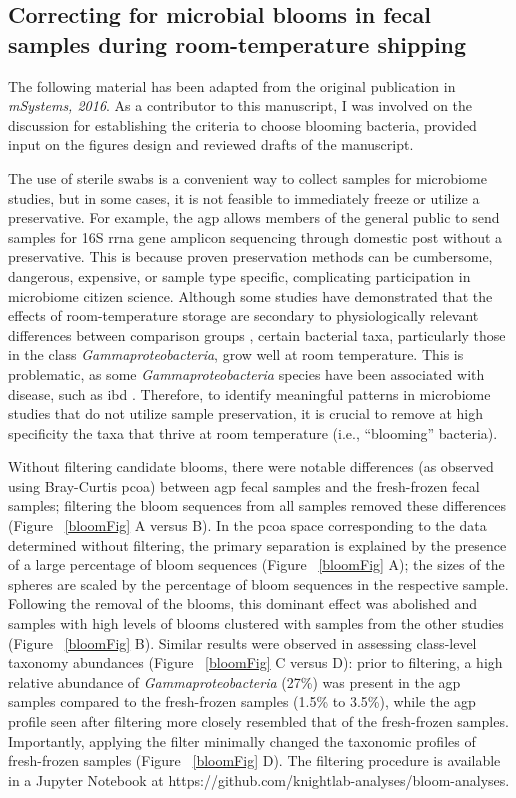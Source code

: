 \subsection{Correcting for microbial blooms in fecal samples during room-temperature shipping}\label{subsection_bloom}
The following material has been adapted from the original publication in
\textsl{mSystems, 2016}. As a contributor to this manuscript, I was involved on
the discussion for establishing the criteria to choose blooming bacteria, provided
input on the figures design and reviewed drafts of the manuscript.

The use of sterile swabs is a convenient way to collect samples for microbiome studies,
but in some cases, it is not feasible to immediately freeze or utilize a preservative.
For example, the \gls{agp} allows members of the general public to send samples for 16S
\gls{rrna} gene amplicon sequencing through domestic post without a preservative.
This is because proven preservation methods can be cumbersome, dangerous, expensive,
or sample type specific, complicating participation in microbiome citizen science.
Although some studies have demonstrated that the effects of room-temperature storage
are secondary to physiologically relevant differences between comparison groups
\cite{Song2016, Sinha2016, Lauber2010}, certain bacterial taxa,
particularly those in the class \emph{Gammaproteobacteria}, grow well at room temperature.
This is problematic, as some \emph{Gammaproteobacteria} species have been associated
with disease, such as \gls{ibd} \cite{Gevers2014}. Therefore, to identify meaningful
patterns in microbiome studies that do not utilize sample preservation, it is crucial
to remove at high specificity the taxa that thrive at room temperature (i.e., “blooming” bacteria).

Without filtering candidate blooms, there were notable differences (as observed using Bray-Curtis
\gls{pcoa}) between \gls{agp} fecal samples and the fresh-frozen fecal samples;
filtering the bloom sequences from all samples removed these differences (Figure ~\ref{bloomFig} A versus B).
In the \gls{pcoa} space corresponding to the data determined without filtering, the primary
separation is explained by the presence of a large percentage of bloom sequences (Figure ~\ref{bloomFig} A);
the sizes of the spheres are scaled by the percentage of bloom sequences in the respective sample.
Following the removal of the blooms, this dominant effect was abolished and samples with high levels of
blooms clustered with samples from the other studies (Figure ~\ref{bloomFig} B). Similar results were observed
in assessing class-level taxonomy abundances (Figure ~\ref{bloomFig} C versus D): prior to filtering,
a high relative abundance of \emph{Gammaproteobacteria} (27\%) was present in the \gls{agp} samples
compared to the fresh-frozen samples (1.5\% to 3.5\%), while the \gls{agp} profile seen after filtering
more closely resembled that of the fresh-frozen samples. Importantly, applying the filter minimally
changed the taxonomic profiles of fresh-frozen samples (Figure ~\ref{bloomFig} D). The filtering
procedure is available in a Jupyter Notebook \cite{Perez2007} at https://github.com/knightlab-analyses/bloom-analyses.

